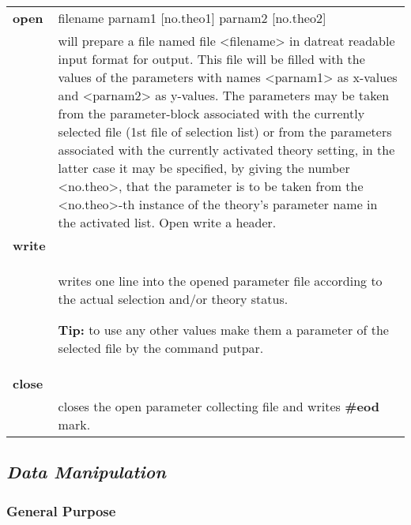 \documentclass[]{article}
\begin{document}
\begin{longtable}[]{@{}ll@{}}
\toprule
\endhead
\textbf{open} & filename parnam1 {[}no.theo1{]} parnam2
{[}no.theo2{]}\tabularnewline
& will prepare a file named file \textless{}filename\textgreater{} in
datreat readable input format for output. This file will be filled with
the values of the parameters with names \textless{}parnam1\textgreater{}
as x-values and \textless{}parnam2\textgreater{} as y-values. The
parameters may be taken from the parameter-block associated with the
currently selected file (1st file of selection list) or from the
parameters associated with the currently activated theory setting, in
the latter case it may be specified, by giving the number
\textless{}no.theo\textgreater{}, that the parameter is to be taken from
the \textless{}no.theo\textgreater{}-th instance of the theory's
parameter name in the activated list. Open write a
header.\tabularnewline
\textbf{write} &\tabularnewline
\begin{minipage}[t]{0.47\columnwidth}\raggedright
\strut
\end{minipage} & \begin{minipage}[t]{0.47\columnwidth}\raggedright
writes one line into the opened parameter file according to the actual
selection and/or theory status.

\textbf{Tip:} to use any other values make them a parameter of the
selected file by the command putpar.\strut
\end{minipage}\tabularnewline
\textbf{close} &\tabularnewline
& closes the open parameter collecting file and writes \textbf{\#eod}
mark.\tabularnewline
\bottomrule
\end{longtable}

\hypertarget{data-manipulation}{%
\subsection{\texorpdfstring{\emph{Data
Manipulation}}{Data Manipulation}}\label{data-manipulation}}

\hypertarget{section}{%
\subsubsection{}\label{section}}

\hypertarget{general-purpose}{%
\subsubsection{General Purpose}\label{general-purpose}}
\end{document}
